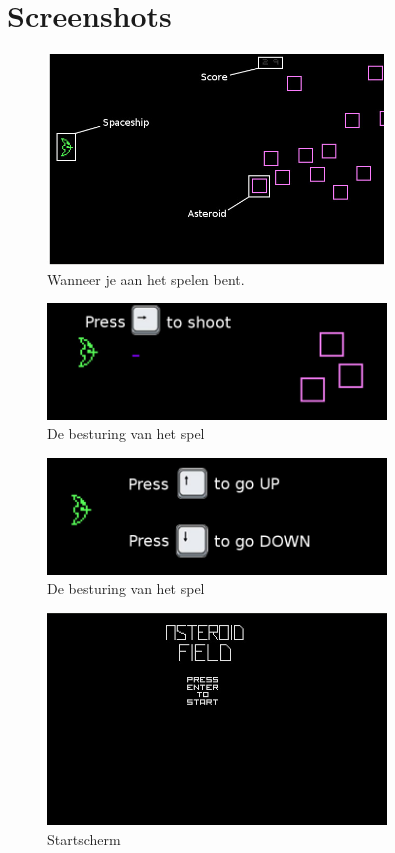 \documentclass{article}
\begin{document}
\begin {itemize}
\end {itemize}

\newpage
\section{Screenshots}\label{screens}
\begin{figure}[htbp]
\includegraphics[width=90mm]{In_Game.jpg}
\caption{Wanneer je aan het spelen bent.}
\label{fig:ingame}
\end{figure}

\begin{figure}[htbp]
\includegraphics[width=90mm]{PressToShoot.jpg}
\caption{De besturing van het spel}
\label{fig:besturing}
\end{figure}

\begin{figure}[htbp]
\includegraphics[width=90mm]{Up_Down.jpg}
\caption{De besturing van het spel}
\label{fig:besturing}
\end{figure}

\begin{figure}[htbp]
\includegraphics[width=90mm]{Menu.jpg}
\caption{Startscherm}
\label{fig:menu}
\end{figure}
\end{document}
